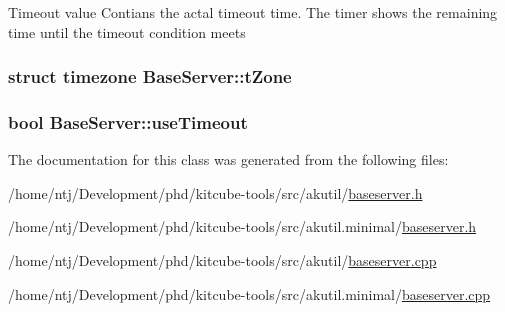 Timeout value Contians the actal timeout time. The timer shows the remaining time until the timeout condition meets \hypertarget{classBaseServer_a234e5bf97bfbddb110ca8505d16e1ca0}{
\subsubsection[{t\-Zone}]{\setlength{\rightskip}{0pt plus 5cm}struct timezone Base\-Server\-::t\-Zone\hspace{0.3cm}{\ttfamily [protected]}}}\label{classBaseServer_a234e5bf97bfbddb110ca8505d16e1ca0}
\hypertarget{classBaseServer_a68765146a8e39ba997e3e08ecb23634c}{
\subsubsection[{use\-Timeout}]{\setlength{\rightskip}{0pt plus 5cm}bool Base\-Server\-::use\-Timeout\hspace{0.3cm}{\ttfamily [protected]}}}\label{classBaseServer_a68765146a8e39ba997e3e08ecb23634c}


The documentation for this class was generated from the following files\-:\begin{DoxyCompactItemize}
\item 
/home/ntj/\-Development/phd/kitcube-\/tools/src/akutil/\hyperlink{baseserver_8h}{baseserver.\-h}\item 
/home/ntj/\-Development/phd/kitcube-\/tools/src/akutil.\-minimal/\hyperlink{minimal_2baseserver_8h}{baseserver.\-h}\item 
/home/ntj/\-Development/phd/kitcube-\/tools/src/akutil/\hyperlink{baseserver_8cpp}{baseserver.\-cpp}\item 
/home/ntj/\-Development/phd/kitcube-\/tools/src/akutil.\-minimal/\hyperlink{minimal_2baseserver_8cpp}{baseserver.\-cpp}\end{DoxyCompactItemize}
